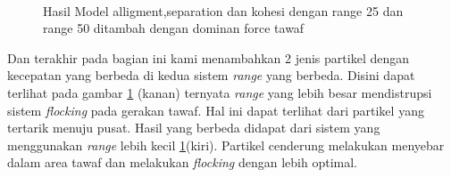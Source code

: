 \begin{figure}\
\centering
{}
\hfill
{}

\caption{Hasil Model alligment,separation dan kohesi dengan range 25 dan range 50 ditambah dengan dominan force tawaf}
\label{fig:2grafikmodel4gaya}
\end{figure}

Dan terakhir pada bagian ini kami menambahkan 2 jenis partikel dengan kecepatan yang berbeda di kedua sistem \textit{range} yang berbeda. Disini dapat terlihat pada gambar \ref{fig:2grafikmodel4gaya} (kanan) ternyata \textit{range} yang lebih besar mendistrupsi sistem \textit{flocking} pada gerakan tawaf. Hal ini dapat terlihat dari partikel yang tertarik menuju pusat. Hasil yang berbeda didapat dari sistem yang menggunakan \textit{range} lebih kecil \ref{fig:2grafikmodel4gaya}(kiri). Partikel cenderung melakukan menyebar dalam area tawaf dan melakukan \textit{flocking} dengan lebih optimal. 

